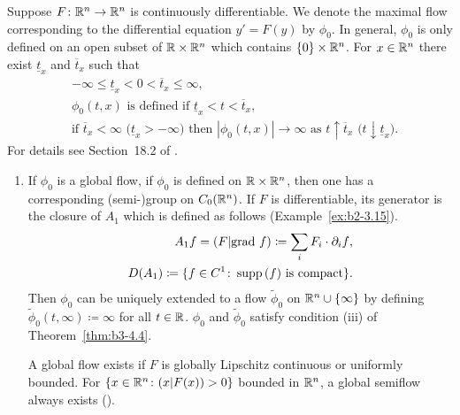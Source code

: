 \begin{example}\label{ex:b3-4.6}
	Suppose $F \colon \mathbb{R}^n \to \mathbb{R}^n$ is continuously differentiable.
	We denote the maximal flow corresponding to the differential equation%
    $y' = F(y)$ by $\phi_{0}$.
	In general, $\phi_{0}$ is only defined on an open subset of\/ $\mathbb{R} \times \mathbb{R}^n$ which contains $\{0\} \times \mathbb{R}^n$.
	For $x \in \mathbb{R}^n$ there exist $\underline{t}_{x}$ and $\overline{t}_{x}$ such that
	\begin{equation}\label{eq:b3-4.11}
		\begin{aligned}
			&-\infty \leq \underline{t}_{x} < 0 < \overline{t}_{x} \leq \infty ,  \\
			&\phi_{0}(t,x) \text{ is defined if } \underline{t}_{x} < t < \overline{t}_{x} ,  \\
			&\text{if } \overline{t}_{x} < \infty \text{ (}\underline{t}_{x} > -\infty\text{)} \text{ then } |\phi_{0}(t,x)| \to \infty \text{ as } t\uparrow\overline{t}_{x} \text{ (}t\downarrow\underline{t}_{x}\text{)}.
		\end{aligned}
	\end{equation}
	For details see Section~18.2 of \textcite{dieudonne:1971}.
	\begin{enumerate}[\upshape (i), wide, labelindent=.25em]
	\item
	If\/ $\phi_{0}$ is a global flow, \ie if\/ $\phi_{0}$ is defined on $\mathbb{R} \times \mathbb{R}^n$, then one has a corresponding (semi-)group on $C_{0}(\mathbb{R}^n)$.
	If\/ $F$ is differentiable, its generator is the closure of\/ $A_{1}$ which is defined as follows (\cf Example~\ref{ex:b2-3.15}).
	\begin{equation}\label{eq:b3-4.12}
		\begin{aligned}
			A_{1}f = (F|\text{grad }f) \coloneq 
            {  \sum_i F_{i} \cdot \partial_{i}f}  ,  \\
			D(A_{1}) \coloneq \{f \in C^1 \colon \mathop{}\!\mathrm{supp}\,(f)  \text{ is compact}\}.
		\end{aligned}
	\end{equation}
	Then $\phi_{0}$ can be uniquely extended to a flow $\tilde{\phi}_{0}$ on $\mathbb{R}^n\cup\{\infty\}$ by defining $\tilde{\phi}_{0}(t,\infty) \coloneq \infty$ for all $t \in \mathbb{R}$.
	$\phi_{0}$ and $\tilde{\phi}_{0}$ satisfy condition (iii) of Theorem~\ref{thm:b3-4.4}.

    A global flow exists if\/ $F$ is globally Lipschitz continuous or uniformly bounded. 
    For $\{x \in \mathbb{R}^n \colon (x|F(x)) > 0\}$ bounded in $\mathbb{R}^n$, a global semiflow always exists (\cf \textcite[Section~5.2]{deimling:1977}).
    

\end{enumerate}
\end{example}
